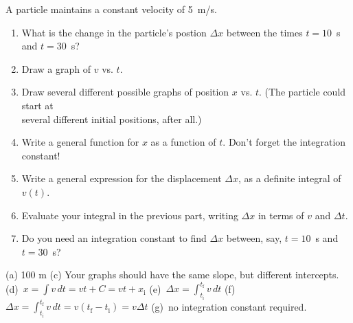 \vspace{-0.6in}
\begin{Exercise}
\label{easy_integration_review_prob}
A particle maintains a constant velocity of 5~m/s.  
\begin{enumerate}[label=(\alph*), nosep, topsep=-2ex, after={\vspace{2ex}}]
\item What is the change in the particle's postion $\Delta x$ between the times $t=10$~s and $t=30$~s?  
\item Draw a graph of $v$ vs. $t$.  
\item Draw several different possible graphs of position $x$ vs. $t$.  (The particle could start at \\
several different initial positions, after all.)  
\item Write a general function for $x$ as a function of $t$.  Don't forget the integration constant!  
\item Write a general expression for the displacement $\Delta x$, as a definite integral of $v(t)$.  
\item Evaluate your integral in the previous part, writing $\Delta x$ in terms of $v$ and $\Delta t$.  
\item Do you need an integration constant to find $\Delta x$ between, say, $t=10$~s and $t=30$~s?
\end{enumerate}
\end{Exercise}
\begin{Answer}
(a) 100 m (c) Your graphs should have the same slope, but different intercepts.
(d)~$x=\int{v\,dt}=vt+C=vt+x_\text{i}$
(e)~$\Delta x=  \int_{t_\text{i}}^{t_\text{f}}{ v\, dt}$
(f)~$ \Delta x=   \int_{t_\text{i}}^{t_\text{f}}{ v\, dt} = v(t_\text{f} - t_\text{i})=v\Delta t$
(g)~no integration constant required.
\end{Answer}


